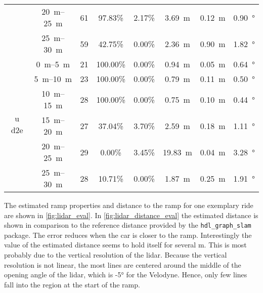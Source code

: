\begin{table}[htbp]
\begin{tabular}[t]{cccccccc}
                               & \SIrange{20}{25}{\metre} & 61              & 97.83\%        & 2.17\%         & \SI{3.69}{\metre}  & \SI{0.12}{\metre} & \SI{0.90}{\degree}     \\
                               & \SIrange{25}{30}{\metre} & 59              & 42.75\%        & 0.00\%         & \SI{2.36}{\metre}  & \SI{0.90}{\metre} & \SI{1.82}{\degree}     \\
        \hline
        \multirow{6}{*}{u d2e} & \SIrange{0}{5}{\metre}   & 21              & 100.00\%       & 0.00\%         & \SI{0.94}{\metre}  & \SI{0.05}{\metre} & \SI{0.64}{\degree}     \\
                               & \SIrange{5}{10}{\metre}  & 23              & 100.00\%       & 0.00\%         & \SI{0.79}{\metre}  & \SI{0.11}{\metre} & \SI{0.50}{\degree}     \\
                               & \SIrange{10}{15}{\metre} & 28              & 100.00\%       & 0.00\%         & \SI{0.75}{\metre}  & \SI{0.10}{\metre} & \SI{0.44}{\degree}     \\
                               & \SIrange{15}{20}{\metre} & 27              & 37.04\%        & 3.70\%         & \SI{2.59}{\metre}  & \SI{0.18}{\metre} & \SI{1.11}{\degree}     \\
                               & \SIrange{20}{25}{\metre} & 29              & 0.00\%         & 3.45\%         & \SI{19.83}{\metre} & \SI{0.04}{\metre} & \SI{3.28}{\degree}     \\
                               & \SIrange{25}{30}{\metre} & 28              & 10.71\%        & 0.00\%         & \SI{1.87}{\metre}  & \SI{0.25}{\metre} & \SI{1.91}{\degree}     \\
        \bottomrule
    \end{tabular}
\end{table}
The estimated ramp properties and distance to the ramp for one exemplary ride are shown in \cref{fig:lidar_eval}.
In \cref{fig:lidar_distance_eval} the estimated distance is shown in comparison to the reference distance provided by the \texttt{hdl\_graph\_slam} package.
The error reduces when the car is closer to the ramp.
Interestingly the value of the estimated distance seems to hold itself for several \si{\metre}.
This is most probably due to the vertical resolution of the \gls{lidar}.
Because the vertical resolution is not linear, the most lines are centered around the middle of the opening angle of the \gls{lidar}, which is -\ang{5} for the Velodyne.
Hence, only few lines fall into the region at the start of the ramp.
